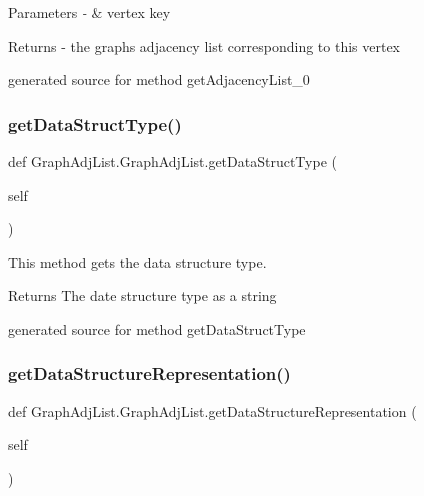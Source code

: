 \begin{DoxyParams}{Parameters}
{\em -\/} & vertex key\\
\hline
\end{DoxyParams}
\begin{DoxyReturn}{Returns}
-\/ the graph\textquotesingle{}s adjacency list corresponding to this vertex\begin{DoxyVerb}generated source for method getAdjacencyList_0 \end{DoxyVerb}
 
\end{DoxyReturn}
\hypertarget{class_graph_adj_list_1_1_graph_adj_list_a19fd235cb56eaaf5335331088bb52c37}{}\label{class_graph_adj_list_1_1_graph_adj_list_a19fd235cb56eaaf5335331088bb52c37} 
\subsubsection{\texorpdfstring{get\+Data\+Struct\+Type()}{getDataStructType()}}
{\footnotesize\ttfamily def Graph\+Adj\+List.\+Graph\+Adj\+List.\+get\+Data\+Struct\+Type (\begin{DoxyParamCaption}\item[{}]{self }\end{DoxyParamCaption})}



This method gets the data structure type. 

\begin{DoxyReturn}{Returns}
The date structure type as a string\begin{DoxyVerb}generated source for method getDataStructType \end{DoxyVerb}
 
\end{DoxyReturn}
\hypertarget{class_graph_adj_list_1_1_graph_adj_list_abb989d64385323cd0032c74c85b449fa}{}\label{class_graph_adj_list_1_1_graph_adj_list_abb989d64385323cd0032c74c85b449fa} 
\subsubsection{\texorpdfstring{get\+Data\+Structure\+Representation()}{getDataStructureRepresentation()}}
{\footnotesize\ttfamily def Graph\+Adj\+List.\+Graph\+Adj\+List.\+get\+Data\+Structure\+Representation (\begin{DoxyParamCaption}\item[{}]{self }\end{DoxyParamCaption})}



